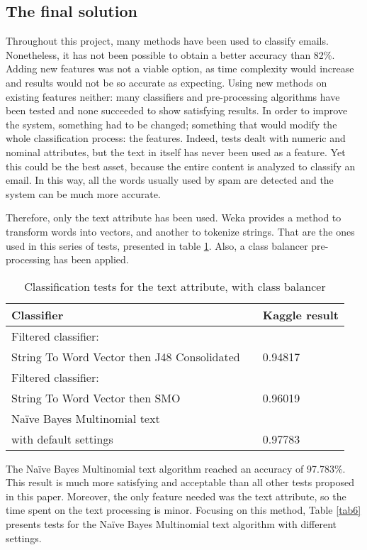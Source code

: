 \documentclass[runningheads]{llncs}
\begin{document}
\subsection{The final solution}
%
Throughout this project, many methods have been used to classify emails. Nonetheless, it has not been possible to obtain a better accuracy than 82\%. Adding new features was not a viable option, as time complexity would increase and results would not be so accurate as expecting. Using new methods on existing features neither: many classifiers and pre-processing algorithms have been tested and none succeeded to show satisfying results. In order to improve the system, something had to be changed; something that would modify the whole classification process: the features. Indeed, tests dealt with numeric and nominal attributes, but the text in itself has never been used as a feature. Yet this could be the best asset, because the entire content is analyzed to classify an email. In this way, all the words usually used by spam are detected and the system can be much more accurate. \par Therefore, only the text attribute has been used. Weka provides a method to transform words into vectors, and another to tokenize strings. That are the ones used in this series of tests, presented in table \ref{tab5}. Also, a class balancer pre-processing has been applied. \par
%
\begin{table}
\caption{Classification tests for the text attribute, with class balancer}\label{tab5}
\centering
\begin{tabular}{|l|l|l|}
\hline
Classifier && Kaggle result \\
\hline \hline
Filtered classifier: && \\
String To Word Vector then J48 Consolidated && 0.94817 \\\hline
Filtered classifier: && \\
String To Word Vector then SMO && 0.96019 \\\hline
Naïve Bayes Multinomial text && \\
with default settings && 0.97783 \\\hline
\hline
\end{tabular}
\end{table}
%
The Naïve Bayes Multinomial text algorithm reached an accuracy of 97.783\%. This result is much more satisfying and acceptable than all other tests proposed in this paper. Moreover, the only feature needed was the text attribute, so the time spent on the text processing is minor. Focusing on this method, Table \ref{tab6} presents tests for the Naïve Bayes Multinomial text algorithm with different settings. \\\par
\end{document}
